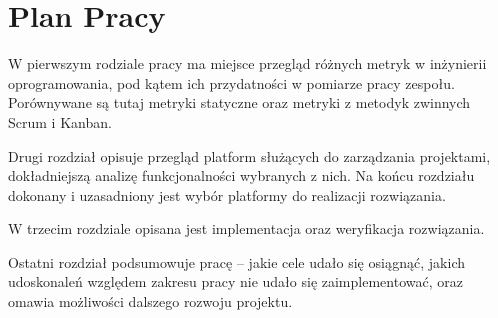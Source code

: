 \section*{Plan Pracy}
W pierwszym rodziale pracy ma miejsce przegląd różnych metryk w inżynierii oprogramowania, pod kątem ich przydatności w pomiarze pracy zespołu.
Porównywane są tutaj metryki statyczne oraz metryki z metodyk zwinnych Scrum i Kanban.

Drugi rozdział opisuje przegląd platform służących do zarządzania projektami, dokładniejszą analizę funkcjonalności wybranych z nich.
Na końcu rozdziału dokonany i uzasadniony jest wybór platformy do realizacji rozwiązania.

W trzecim rozdziale opisana jest implementacja oraz weryfikacja rozwiązania.

Ostatni rozdział podsumowuje pracę -- jakie cele udało się osiągnąć, jakich udoskonaleń względem zakresu pracy nie udało się zaimplementować, oraz
omawia możliwości dalszego rozwoju projektu.
